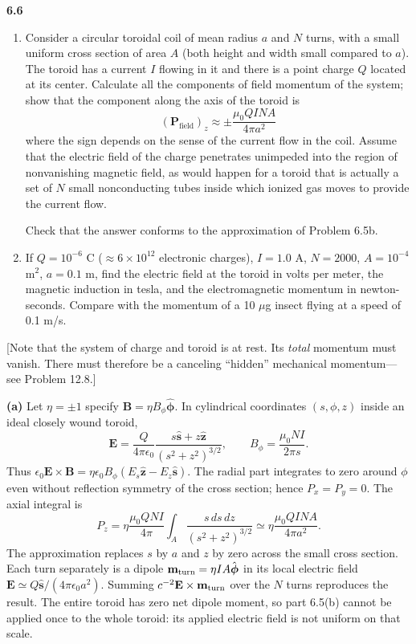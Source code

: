 \par\bigskip
\noindent\textbf{6.6}\quad\begin{enumerate}
\item[(a)] Consider a circular toroidal coil of mean radius $a$ and $N$ turns, with a small uniform cross section of area $A$ (both height and width small compared to $a$). The toroid has a current $I$ flowing in it and there is a point charge $Q$ located at its center. Calculate all the components of field momentum of the system; show that the component along the axis of the toroid is
\[
(\mathbf{P}_{\mathrm{field}})_{z}\approx\pm\frac{\mu_{0}QINA}{4\pi a^{2}}
\]
where the sign depends on the sense of the current flow in the coil. Assume that the electric field of the charge penetrates unimpeded into the region of nonvanishing magnetic field, as would happen for a toroid that is actually a set of $N$ small nonconducting tubes inside which ionized gas moves to provide the current flow.

Check that the answer conforms to the approximation of Problem 6.5b.
\item[(b)] If $Q=10^{-6}$ C ($\approx6\times10^{12}$ electronic charges), $I=1.0$ A, $N=2000$, $A=10^{-4}$ m$^{2}$, $a=0.1$ m, find the electric field at the toroid in volts per meter, the magnetic induction in tesla, and the electromagnetic momentum in newton-seconds. Compare with the momentum of a 10 $\mu$g insect flying at a speed of 0.1 m/s.
\end{enumerate}
[Note that the system of charge and toroid is at rest. Its \emph{total} momentum must vanish. There must therefore be a canceling ``hidden'' mechanical momentum---see Problem 12.8.]
\solution

\textbf{(a)} Let $\eta=\pm1$ specify $\mathbf B=\eta B_\phi\hat{\boldsymbol\phi}$.
In cylindrical coordinates $(s,\phi,z)$ inside an ideal closely wound toroid,
\[
\mathbf E=\frac{Q}{4\pi\epsilon_0}
\frac{s\hat{\mathbf s}+z\hat{\mathbf z}}{(s^2+z^2)^{3/2}},\qquad
B_\phi=\frac{\mu_0NI}{2\pi s}.
\]
Thus $\epsilon_0\mathbf E\times\mathbf B
=\eta\epsilon_0B_\phi(E_s\hat{\mathbf z}-E_z\hat{\mathbf s})$.
The radial part integrates to zero around $\phi$ even without reflection
symmetry of the cross section; hence $P_x=P_y=0$. The axial integral is
\[
P_z=\eta\frac{\mu_0QNI}{4\pi}
\int_A\frac{s\,ds\,dz}{(s^2+z^2)^{3/2}}
\simeq\boxed{\eta\frac{\mu_0QINA}{4\pi a^2}}.
\]
The approximation replaces $s$ by $a$ and $z$ by zero across the small
cross section. Each turn separately is a dipole
$\mathbf m_{\rm turn}=\eta IA\hat{\boldsymbol\phi}$ in its local electric
field $\mathbf E\simeq Q\hat{\mathbf s}/(4\pi\epsilon_0a^2)$.
Summing $c^{-2}\mathbf E\times\mathbf m_{\rm turn}$ over the $N$ turns
reproduces the result. The entire toroid has zero net dipole moment, so
part 6.5(b) cannot be applied once to the whole toroid: its applied electric
field is not uniform on that scale.

